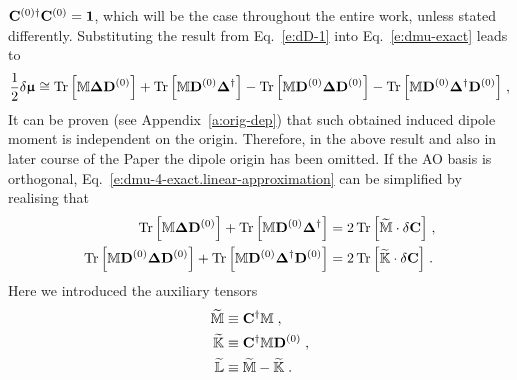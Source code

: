 \documentclass[aip,graphicx]{revtex4-1}
\newcommand{\BM}[1]{\bm{#1}}
\DeclareMathOperator{\Tr}{Tr}
\begin{document}
${\bf C}^{(0)\dagger}{\bf C}^{(0)}={\bf 1}$,
which will be the case throughout the entire work, unless stated differently.
Substituting the result from Eq.~\eqref{e:dD-1}
into Eq.~\eqref{e:dmu-exact} leads to
%
\begin{equation} \label{e:dmu-4-exact.linear-approximation}
 \frac{1}{2} 
 \delta {\BM{\upmu}}
  \cong
   \Tr{ 
    \left[ 
         {\mathbb{M}} {\BM\Delta} {\bf D}^{(0)}  
    \right] }
%
  +\Tr{ 
    \left[ 
         {\mathbb{M}} {\bf D}^{(0)} {\BM\Delta}^{\dagger}
    \right] }
%
  -\Tr{ 
    \left[ 
         {\mathbb{M}} {\bf D}^{(0)} {\BM\Delta} {\bf D}^{(0)}
    \right] }
%
  -\Tr{ 
    \left[ 
         {\mathbb{M}} {\bf D}^{(0)} {\BM\Delta}^{\dagger} {\bf D}^{(0)}
    \right] } \;,
\end{equation}
%
It can be proven (see Appendix~\ref{a:orig-dep}) that such obtained
induced dipole moment is independent on the origin. Therefore,
in the above result and also in later course of the Paper the dipole origin has been omitted. 
If the AO basis is orthogonal, Eq.~\eqref{e:dmu-4-exact.linear-approximation} can be simplified by realising that
%
\begin{subequations}
 \begin{align}
  \Tr{ 
    \left[ 
         {\mathbb{M}} {\BM\Delta} {\bf D}^{(0)}  
    \right] }
%
  +\Tr{ 
    \left[ 
         {\mathbb{M}} {\bf D}^{(0)} {\BM\Delta}^{\dagger}
    \right] }
  &=
2 \Tr{ 
    \left[ 
         \widetilde{\mathbb{M}} \cdot \delta {\bf C}
   \right] }  \;,
%
\\
%
  \Tr{ 
    \left[ 
         {\mathbb{M}} {\bf D}^{(0)} {\BM\Delta} {\bf D}^{(0)}
    \right] }
%
 +\Tr{ 
    \left[ 
         {\mathbb{M}} {\bf D}^{(0)} {\BM\Delta}^{\dagger} {\bf D}^{(0)}
    \right] }
  &=
2 \Tr{ 
    \left[ 
         \widetilde{\mathbb{K}} \cdot \delta {\bf C}
   \right] } \;.
%
 \end{align}
\end{subequations}
%
Here we introduced the auxiliary tensors
%
\begin{subequations}
 \begin{align}
   \widetilde{\mathbb{M}}  &\equiv {\bf C}^\dagger {\mathbb{M}}     \;,           \\
   \widetilde{\mathbb{K}}  &\equiv {\bf C}^\dagger {\mathbb{M}} {\bf D}^{(0)} \;, \\
   \widetilde{\mathbb{L}}  &\equiv \widetilde{\mathbb{M}} - \widetilde{\mathbb{K}} \;.
 \end{align}
\end{subequations}
\end{document}
